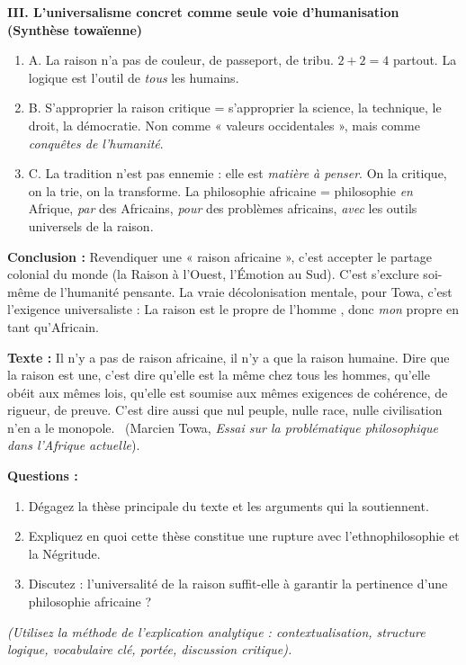\documentclass[11pt]{article}
\begin{document}
\begin{exoresolu}
\textbf{III. L'universalisme concret comme seule voie d'humanisation (Synthèse towaïenne)}
\begin{enumerate}
\item A. La raison n'a pas de couleur, de passeport, de tribu. $2+2=4$ partout. La logique est l'outil de \emph{tous} les humains.
\item B. S'approprier la raison critique = s'approprier la science, la technique, le droit, la démocratie. Non comme « valeurs occidentales », mais comme \emph{conquêtes de l'humanité}.
\item C. La tradition n'est pas ennemie : elle est \emph{matière à penser}. On la critique, on la trie, on la transforme. La philosophie africaine = philosophie \emph{en} Afrique, \emph{par} des Africains, \emph{pour} des problèmes africains, \emph{avec} les outils universels de la raison.
\end{enumerate}

\textbf{Conclusion :} Revendiquer une « raison africaine », c'est accepter le partage colonial du monde (la Raison à l'Ouest, l'Émotion au Sud). C'est s'exclure soi-même de l'humanité pensante. La vraie décolonisation mentale, pour Towa, c'est l'exigence universaliste : \guillemotleft La raison est le propre de l'homme \guillemotright, donc \emph{mon} propre en tant qu'Africain.
\end{exoresolu}

\begin{exercice}
\textbf{Texte :} \guillemotleft Il n'y a pas de raison africaine, il n'y a que la raison humaine. Dire que la raison est une, c'est dire qu'elle est la même chez tous les hommes, qu'elle obéit aux mêmes lois, qu'elle est soumise aux mêmes exigences de cohérence, de rigueur, de preuve. C'est dire aussi que nul peuple, nulle race, nulle civilisation n'en a le monopole. \guillemotright\ (Marcien Towa, \emph{Essai sur la problématique philosophique dans l'Afrique actuelle}).

\textbf{Questions :}
\begin{enumerate}
\item Dégagez la thèse principale du texte et les arguments qui la soutiennent.
\item Expliquez en quoi cette thèse constitue une rupture avec l'ethnophilosophie et la Négritude.
\item Discutez : l'universalité de la raison suffit-elle à garantir la pertinence d'une philosophie africaine ?
\end{enumerate}
\textit{(Utilisez la méthode de l'explication analytique : contextualisation, structure logique, vocabulaire clé, portée, discussion critique).}
\end{exercice}
\end{document}
